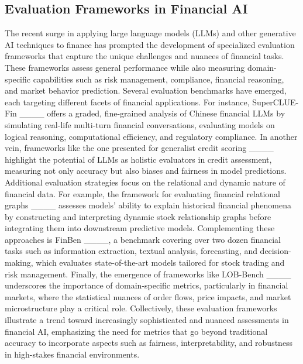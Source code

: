 \subsection{Evaluation Frameworks in Financial AI}

The recent surge in applying large language models (LLMs) and other generative AI techniques to finance has prompted the development of specialized evaluation frameworks that capture the unique challenges and nuances of financial tasks. These frameworks assess general performance while also measuring domain-specific capabilities such as risk management, compliance, financial reasoning, and market behavior prediction. Several evaluation benchmarks have emerged, each targeting different facets of financial applications. For instance, SuperCLUE-Fin ____ offers a graded, fine-grained analysis of Chinese financial LLMs by simulating real-life multi-turn financial conversations, evaluating models on logical reasoning, computational efficiency, and regulatory compliance. In another vein, frameworks like the one presented for generalist credit scoring ____ highlight the potential of LLMs as holistic evaluators in credit assessment, measuring not only accuracy but also biases and fairness in model predictions. Additional evaluation strategies focus on the relational and dynamic nature of financial data. For example, the framework for evaluating financial relational graphs ____ assesses models' ability to explain historical financial phenomena by constructing and interpreting dynamic stock relationship graphs before integrating them into downstream predictive models. Complementing these approaches is FinBen ____, a benchmark covering over two dozen financial tasks such as information extraction, textual analysis, forecasting, and decision-making, which evaluates state-of-the-art models tailored for stock trading and risk management. Finally, the emergence of frameworks like LOB-Bench ____ underscores the importance of domain-specific metrics, particularly in financial markets, where the statistical nuances of order flows, price impacts, and market microstructure play a critical role. Collectively, these evaluation frameworks illustrate a trend toward increasingly sophisticated and nuanced assessments in financial AI, emphasizing the need for metrics that go beyond traditional accuracy to incorporate aspects such as fairness, interpretability, and robustness in high-stakes financial environments.

